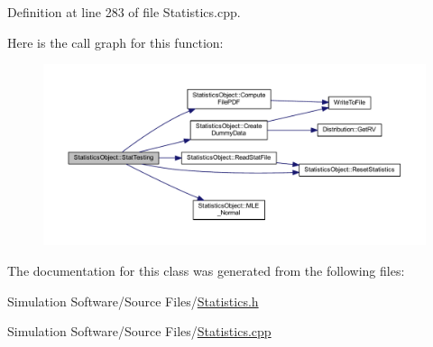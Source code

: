 Definition at line 283 of file Statistics.\+cpp.

Here is the call graph for this function\+:
\nopagebreak
\begin{figure}[H]
\begin{center}
\leavevmode
\includegraphics[width=350pt]{class_statistics_object_a9545eace92c4a478cf20dba20f8e51bf_cgraph}
\end{center}
\end{figure}


The documentation for this class was generated from the following files\+:\begin{DoxyCompactItemize}
\item 
Simulation Software/\+Source Files/\hyperlink{_statistics_8h}{Statistics.\+h}\item 
Simulation Software/\+Source Files/\hyperlink{_statistics_8cpp}{Statistics.\+cpp}\end{DoxyCompactItemize}
